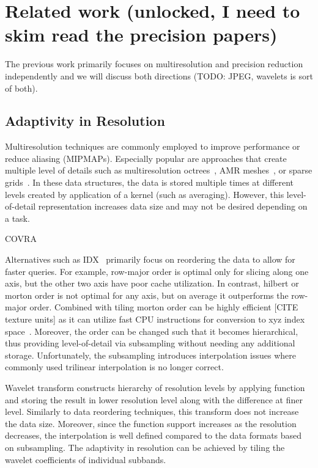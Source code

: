 \section{Related work (unlocked, I need to skim read the precision papers)}

The previous work primarily focuses on multiresolution and precision
reduction independently and we will discuss both directions
(TODO: JPEG, wavelets is sort of both).


\subsection{Adaptivity in Resolution}
Multiresolution techniques are commonly employed to improve performance or
reduce aliasing (MIPMAPs). Especially popular are approaches that create
multiple level of details such as multiresolution octrees~\cite{multires_octree1999},
AMR meshes~\cite{amr1989}, or sparse grids~\cite{vdb2013, spgrid2014}. In these data structures,
the data is stored multiple times at different levels created by application of a kernel
(such as averaging). However, this level-of-detail representation increases data size
and may not be desired depending on a task.


COVRA~\cite{covra2012}

Alternatives such as IDX~\cite{idx2001} primarily focus on reordering the data to allow
for faster queries. For example, row-major order is optimal only for slicing
along one axis, but the other two axis have poor cache utilization. In contrast, hilbert
or morton order is not optimal for any axis, but on average it outperforms the row-major
order. Combined with tiling morton order can be highly efficient [CITE texture units] as
it can utilize fast CPU instructions for conversion to xyz index space~\cite{spgrid2014}.
Moreover, the order can be changed such that it becomes hierarchical, thus providing
level-of-detail via subsampling without needing any additional storage. Unfortunately,
the subsampling introduces interpolation issues where commonly used trilinear interpolation
is no longer correct.

Wavelet transform constructs hierarchy of resolution levels by applying function and storing
the result in lower resolution level along with the difference at finer level. Similarly to
data reordering techniques, this transform does not increase the data size. Moreover, since
the function support increases as the resolution decreases, the interpolation is well defined
compared to the data formats based on subsampling. The adaptivity in resolution can be achieved
by tiling the wavelet coefficients of individual subbands.

